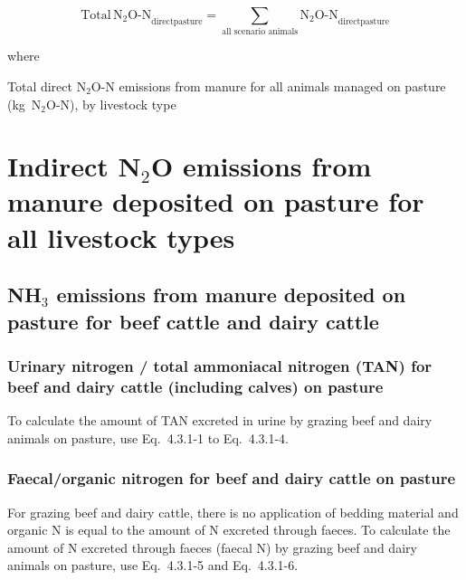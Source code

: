 \begin{equation}
    \mathrm{Total\,N_2O\text{-}N}_{\mathrm{directpasture}}
        = \sum_{\text{all scenario animals}}
          \mathrm{N_2O\text{-}N}_{\mathrm{directpasture}}
    \tag{Eq.\ 5.3.1-4}
\end{equation}

\noindent where

\begin{description}[font=\normalfont, leftmargin=12em, style=nextline, nosep]
    \item[$\mathrm{Total\,N_2O\text{-}N}_{\mathrm{directpasture}}$]
        Total direct N$_2$O-N emissions from manure for all animals managed on
        pasture (kg~N$_2$O-N), by livestock type
\end{description}

\section{Indirect N\texorpdfstring{$_2$}{2}O emissions from manure deposited on pasture for all livestock types}
\label{sec:grazing-indirect-n2o}

\subsection{NH\texorpdfstring{$_3$}{3} emissions from manure deposited on pasture for beef cattle and dairy cattle}
\label{subsec:grazing-nh3-cattle}

\subsubsection{Urinary nitrogen / total ammoniacal nitrogen (TAN) for beef and dairy cattle (including calves) on pasture}
\label{subsubsec:grazing-tan}

To calculate the amount of TAN excreted in urine by grazing beef and dairy
animals on pasture, use Eq.~4.3.1-1 to Eq.~4.3.1-4.

\subsubsection{Faecal/organic nitrogen for beef and dairy cattle on pasture}
\label{subsubsec:grazing-faecal-n}

For grazing beef and dairy cattle, there is no application of bedding material
and organic N is equal to the amount of N excreted through faeces. To calculate
the amount of N excreted through faeces (faecal N) by grazing beef and dairy
animals on pasture, use Eq.~4.3.1-5 and Eq.~4.3.1-6.

